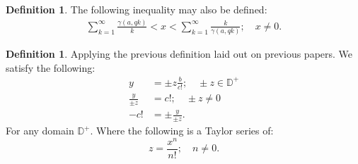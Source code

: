 \documentclass[10pt]{article}
\theoremstyle{plain}
\theoremstyle{definition}
\newtheorem{definition}[theorem]{Definition}
\theoremstyle{remark}
\begin{document}
	\begin{definition}
		The following inequality may also be defined:
		\begin{align*}
			\sum_{k=1}^{\infty} \frac{\gamma(a, qk)}{k} < x < \sum_{k=1}^{\infty} \frac{k}{\gamma(a, qk)}; \quad x \neq 0.
		\end{align*}
	\end{definition}
	
	\begin{definition}
		Applying the previous definition laid out on previous papers. We satisfy the following:
		\begin{align*}
			y &= \pm z \frac{b}{c!}; \quad \pm z \in \mathbb{D}^{+}\\
			\frac{y}{\pm z} &= c!; \quad \pm z \neq 0\\
			-c! &= \pm \frac{y}{\pm z}.
		\end{align*}
		For any domain $\mathbb{D}^{+}$. Where the following is a Taylor series of:
		\begin{equation}
			z = \frac{x^n}{n!}; \quad n \neq 0.
		\end{equation}
	\end{definition}
	
\end{document}
